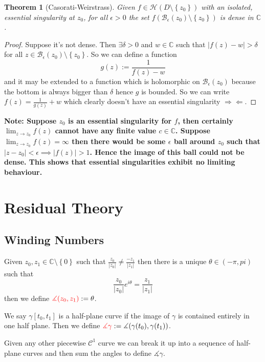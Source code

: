 \documentclass[11pt]{article}
\newcommand{\defeq}{:=}
\newcommand{\abs}[1]{\left|#1\right|}
\newcommand{\contr}{\Rightarrow\Leftarrow}
\newcommand{\C}{\mathbb{C}}
\newenvironment{defin}
	{\begin{mdframed}[backgroundcolor=white, roundcorner=5pt, linewidth=1pt]}
	{\end{mdframed}}
\newcommand{\mdf}[1]{{\color{red} #1}}
\newenvironment{note}
	{\begin{mdframed}[backgroundcolor=white, linecolor=red, roundcorner=5pt, linewidth=1pt]\bfseries{Note:}\normalfont}
	{\end{mdframed}}
\newtheorem{theorem}{Theorem}[section]
\begin{document}
\begin{theorem}[Casorati-Weirstrass]
Given $f\in\mathcal{H}(D\setminus\left\{z_0\right\})$ with an isolated, essential singularity at $z_0$, for all $\epsilon>0$ the set $f(\mathcal{B}_\epsilon(z_0)\setminus\left\{z_0\right\})$ is dense in $\C$.
\end{theorem}

\begin{proof}
Suppose it's not dense.
Then $\exists\delta >0$ and $w\in\C$ such that $\abs{f(z)-w}>\delta$ for all $z\in\mathcal{B}_\epsilon(z_0)\setminus\left\{z_0\right\}$.
So we can define a function
\[
	g(z)\defeq\frac{1}{f(z)-w}
\]
and it may be extended to a function which is holomorphic on $\mathcal{B}_\epsilon(z_0)$ because the bottom is always bigger than $\delta$ hence $g$ is bounded.
So we can write $f(z)=\frac{1}{g(z)}+w$ which clearly doesn't have an essential singularity $\contr$.
\end{proof}

\begin{note}
	Suppose $z_0$ is an essential singularity for $f$, then certainly $\lim_{z\to z_0}f(z)$ cannot have any finite value $c\in \C$.
	Suppose $\lim_{z\to z_0} f(z) = \infty$ then there would be some $\epsilon$ ball around $z_0$ such that $\abs{z-z_0}< \epsilon \implies \abs{f(z)} > 1$.
	Hence the image of this ball could not be dense.
	This shows that essential singularities exhibit no limiting behaviour.
\end{note}

\section{Residual Theory}

\subsection{Winding Numbers}
\begin{defin}
	Given $z_0, z_1\in\C\setminus\left\{0\right\}$ such that $\frac{z_0}{\abs{z_0}}\neq\frac{-z_1}{\abs{z_1}}$ then there is a unique $\theta\in (-\pi, pi)$ such that
	\[
		\frac{z_0}{\abs{z_0}}e^{i\theta}=\frac{z_1}{\abs{z_1}}
	\]
	then we define $\mdf{\measuredangle(z_0,z_1)}\defeq\theta$.
	
	We say $\gamma[t_0, t_1]$ is a \mdf{half-plane curve} if the image of $\gamma$ is contained entirely in one half plane.
	Then we define $\mdf{\measuredangle\gamma}\defeq\measuredangle(\gamma(t_0),\gamma(t_1))$.

	Given any other piecewise $\mathcal{C}^1$ curve we can break it up into a sequence of half-plane curves and then sum the angles to define $\measuredangle\gamma$.
\end{defin}
\end{document}
